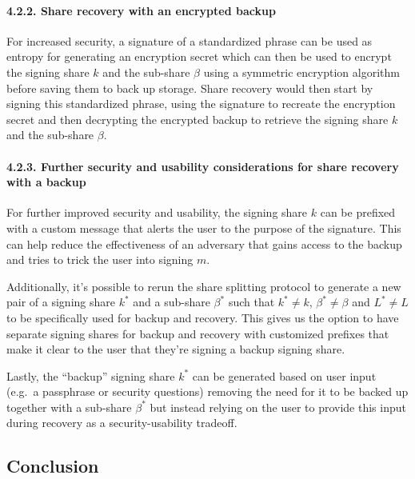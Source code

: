 \documentclass[
]{article}
\begin{document}
\hypertarget{share-recovery-backup-encrypted}{%
\paragraph{4.2.2. Share recovery with an encrypted
backup}\label{share-recovery-backup-encrypted}}

For increased security, a signature of a standardized phrase can be used
as entropy for generating an encryption secret which can then be used to
encrypt the signing share \(k\) and the sub-share \(\beta\) using a
symmetric encryption algorithm before saving them to back up storage.
Share recovery would then start by signing this standardized phrase,
using the signature to recreate the encryption secret and then
decrypting the encrypted backup to retrieve the signing share \(k\) and
the sub-share \(\beta\).

\hypertarget{share-recovery-backup-enhancements}{%
\paragraph{4.2.3. Further security and usability considerations for
share recovery with a backup}\label{share-recovery-backup-enhancements}}

For further improved security and usability, the signing share \(k\) can
be prefixed with a custom message that alerts the user to the purpose of
the signature. This can help reduce the effectiveness of an adversary
that gains access to the backup and tries to trick the user into signing
\(m\).

Additionally, it's possible to rerun the share splitting protocol to
generate a new pair of a signing share \(k^ \ast\) and a sub-share
\(\beta ^ \ast\) such that \(k^ \ast \neq k\),
\(\beta ^ \ast \neq \beta\) and \(L^ \ast \neq L\) to be specifically
used for backup and recovery. This gives us the option to have separate
signing shares for backup and recovery with customized prefixes that
make it clear to the user that they're signing a backup signing share.

Lastly, the ``backup'' signing share \(k^ \ast\) can be generated based
on user input (e.g.~a passphrase or security questions) removing the
need for it to be backed up together with a sub-share \(\beta ^ \ast\)
but instead relying on the user to provide this input during recovery as
a security-usability tradeoff.

\hypertarget{conclusion}{%
\subsection{Conclusion}\label{conclusion}}
\end{document}

